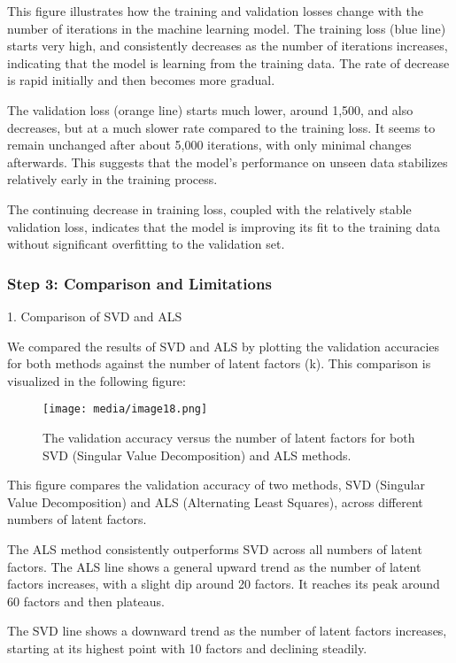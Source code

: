 \documentclass{article}
\begin{document}
This figure illustrates how the training and validation losses change with the number of iterations in the machine learning model. The training loss (blue line) starts very high, and consistently decreases as the number of iterations increases, indicating that the model is learning from the training data. The rate of decrease is rapid initially and then becomes more gradual.

The validation loss (orange line) starts much lower, around 1,500, and also decreases, but at a much slower rate compared to the training loss. It seems to remain unchanged after about 5,000 iterations, with only minimal changes afterwards. This suggests that the model's performance on unseen data stabilizes relatively early in the training process.

The continuing decrease in training loss, coupled with the relatively stable validation loss, indicates that the model is improving its fit to the training data without significant overfitting to the validation set.

\subsubsection{Step 3: Comparison and Limitations}

1. Comparison of SVD and ALS

We compared the results of SVD and ALS by plotting the validation accuracies for both methods against the number of latent factors (k). This comparison is visualized in the following figure:

\begin{figure}[htbp]
\centering
\texttt{[image: media/image18.png]}
\caption{The validation accuracy versus the number of latent factors for both SVD (Singular Value Decomposition) and ALS methods.}
\end{figure}

This figure compares the validation accuracy of two methods, SVD (Singular Value Decomposition) and ALS (Alternating Least Squares), across different numbers of latent factors.

The ALS method consistently outperforms SVD across all numbers of latent factors. The ALS line shows a general upward trend as the number of latent factors increases, with a slight dip around 20 factors. It reaches its peak around 60 factors and then plateaus.

The SVD line shows a downward trend as the number of latent factors increases, starting at its highest point with 10 factors and declining steadily.
\end{document}
